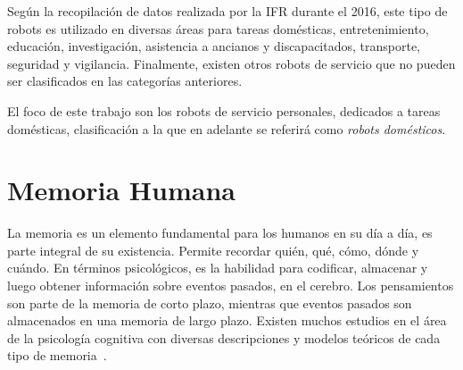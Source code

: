 Según la recopilación de datos realizada por la IFR durante el 2016, este tipo de robots es utilizado en diversas áreas para tareas domésticas, entretenimiento, educación, investigación, asistencia a ancianos y discapacitados, transporte, seguridad y vigilancia. Finalmente, existen otros robots de servicio que no pueden ser clasificados en las categorías anteriores.

El foco de este trabajo son los robots de servicio personales, dedicados a tareas domésticas, clasificación a la que en  adelante se referirá como \textit{robots domésticos}.










\section{Memoria Humana}\label{sec:human_memory}

La memoria es un elemento fundamental para los humanos en su día a día, es parte integral de su existencia. Permite recordar quién, qué, cómo, dónde y cuándo. En términos psicológicos, es la habilidad para codificar, almacenar y luego obtener información sobre eventos pasados, en el cerebro. Los pensamientos son parte de la memoria de corto plazo, mientras que eventos pasados son almacenados en una memoria de largo plazo. Existen muchos estudios en el área de la psicología cognitiva con diversas descripciones y modelos teóricos de cada tipo de memoria~\cite{Vijayakumar2014}.


